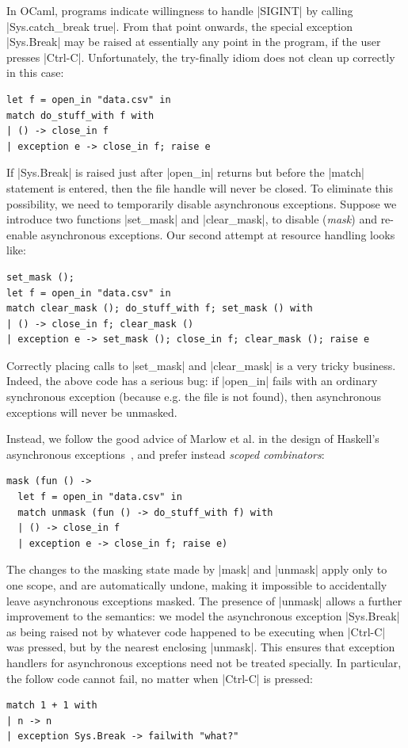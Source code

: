 \documentclass{llncs}
\begin{document}
In OCaml, programs indicate willingness to handle |SIGINT| by
calling |Sys.catch_break true|. From that point onwards, the
special exception |Sys.Break| may be raised at essentially any
point in the program, if the user presses |Ctrl-C|.
Unfortunately, the try-finally idiom does not clean up correctly in
this case:
\begin{lstlisting}
let f = open_in "data.csv" in
match do_stuff_with f with
| () -> close_in f
| exception e -> close_in f; raise e
\end{lstlisting}
If |Sys.Break| is raised just after |open_in| returns but before the
|match| statement is entered, then the file handle will never be
closed. To eliminate this possibility, we need to temporarily disable
asynchronous exceptions. Suppose we introduce two functions |set_mask|
and |clear_mask|, to disable (\emph{mask}) and re-enable asynchronous
exceptions. Our second attempt at resource handling looks like:
\begin{lstlisting}
set_mask ();
let f = open_in "data.csv" in
match clear_mask (); do_stuff_with f; set_mask () with
| () -> close_in f; clear_mask ()
| exception e -> set_mask (); close_in f; clear_mask (); raise e
\end{lstlisting}
Correctly placing calls to |set_mask| and |clear_mask| is a
very tricky business. Indeed, the above code has a serious bug: if
|open_in| fails with an ordinary synchronous exception (because
e.g. the file is not found), then asynchronous exceptions will never
be unmasked.

Instead, we follow the good advice of Marlow et al. in the design of
Haskell's asynchronous exceptions~\citep*{Marlow2001async},
and prefer instead \emph{scoped combinators}:
\begin{lstlisting}
mask (fun () ->
  let f = open_in "data.csv" in
  match unmask (fun () -> do_stuff_with f) with
  | () -> close_in f
  | exception e -> close_in f; raise e)
\end{lstlisting}
The changes to the masking state made by |mask| and |unmask|
apply only to one scope, and are automatically undone, making it
impossible to accidentally leave asynchronous exceptions masked.
The presence of |unmask| allows a further improvement to the
semantics: we model the asynchronous exception |Sys.Break| as being
raised not by whatever code happened to be executing when |Ctrl-C| was
pressed, but by the nearest enclosing |unmask|. This ensures that exception
handlers for asynchronous exceptions need not be treated specially. In
particular, the follow code cannot fail, no matter when |Ctrl-C| is
pressed:
\begin{lstlisting}
match 1 + 1 with
| n -> n
| exception Sys.Break -> failwith "what?"
\end{lstlisting}
\end{document}
